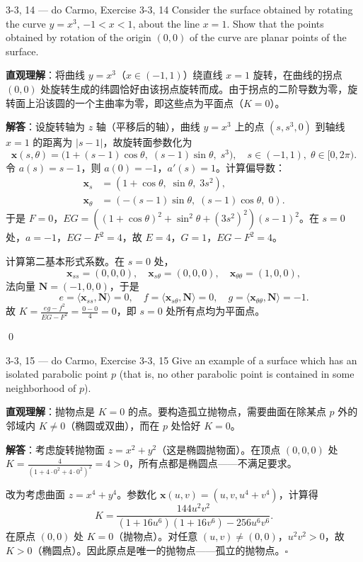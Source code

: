 \begin{exercise}{3-3, 14 — do Carmo, Exercise 3-3, 14}
Consider the surface obtained by rotating the curve $y = x^3$, $-1 < x < 1$, about the line $x = 1$. Show that the points obtained by rotation of the origin $(0,0)$ of the curve are planar points of the surface.
\end{exercise}

\begin{solution}
\textbf{直观理解}：将曲线 $y=x^3$（$x\in(-1,1)$）绕直线 $x=1$ 旋转，在曲线的拐点 $(0,0)$ 处旋转生成的纬圆恰好由该拐点旋转而成。由于拐点的二阶导数为零，旋转面上沿该圆的一个主曲率为零，即这些点为平面点（$K=0$）。

\textbf{解答}：设旋转轴为 $z$ 轴（平移后的轴），曲线 $y=x^3$ 上的点 $(s, s^3, 0)$ 到轴线 $x=1$ 的距离为 $|s-1|$，故旋转面参数化为
\[
\mathbf{x}(s,\theta)=\bigl(1+(s-1)\cos\theta,\;(s-1)\sin\theta,\;s^3\bigr),\quad s\in(-1,1),\;\theta\in[0,2\pi).
\]
令 $a(s)=s-1$，则 $a(0)=-1$，$a'(s)=1$。计算偏导数：
\[
\begin{aligned}
\mathbf{x}_s &= (1+\cos\theta,\;\sin\theta,\;3s^2),\\
\mathbf{x}_\theta &= (-(s-1)\sin\theta,\;(s-1)\cos\theta,\;0).
\end{aligned}
\]
于是 $F=0$，$EG=((1+\cos\theta)^2+\sin^2\theta+(3s^2)^2)(s-1)^2$。在 $s=0$ 处，$a=-1$，$EG-\!F^2=4$，故 $E=4$，$G=1$，$EG-F^2=4$。

计算第二基本形式系数。在 $s=0$ 处，
\[
\mathbf{x}_{ss}=(0,0,0),\quad \mathbf{x}_{s\theta}=(0,0,0),\quad \mathbf{x}_{\theta\theta}=(1,0,0),
\]
法向量 $\mathbf{N}=(-1,0,0)$，于是
\[
e=\langle\mathbf{x}_{ss},\mathbf{N}\rangle=0,\quad f=\langle\mathbf{x}_{s\theta},\mathbf{N}\rangle=0,\quad g=\langle\mathbf{x}_{\theta\theta},\mathbf{N}\rangle=-1.
\]
故 $K=\frac{eg-f^2}{EG-F^2}=\frac{0-0}{4}=0$，即 $s=0$ 处所有点均为平面点。

\qed
\end{solution}

\begin{exercise}{3-3, 15 — do Carmo, Exercise 3-3, 15}
Give an example of a surface which has an isolated parabolic point $p$ (that is, no other parabolic point is contained in some neighborhood of $p$).
\end{exercise}

\begin{solution}
\textbf{直观理解}：抛物点是 $K=0$ 的点。要构造孤立抛物点，需要曲面在除某点 $p$ 外的邻域内 $K\neq 0$（椭圆或双曲），而在 $p$ 处恰好 $K=0$。

\textbf{解答}：考虑旋转抛物面 $z = x^2 + y^2$（这是椭圆抛物面）。在顶点 $(0,0,0)$ 处 $K=\frac{4}{(1+4\cdot 0^2+4\cdot 0^2)^2}=4>0$，所有点都是椭圆点——不满足要求。

改为考虑曲面 $z = x^4 + y^4$。参数化 $\mathbf{x}(u,v) = (u, v, u^4+v^4)$，计算得
\[
K = \frac{144u^2v^2}{(1+16u^6)(1+16v^6)-256u^6v^6}.
\]
在原点 $(0,0)$ 处 $K=0$（抛物点）。对任意 $(u,v)\neq(0,0)$，$u^2v^2>0$，故 $K>0$（椭圆点）。因此原点是唯一的抛物点——孤立的抛物点。$\square$
\end{solution}

